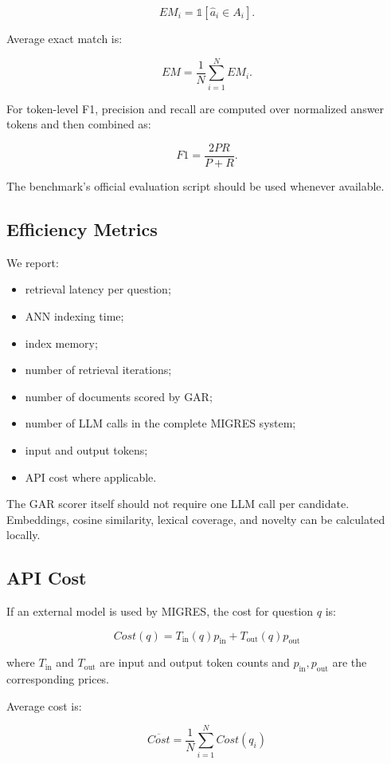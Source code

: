 \documentclass[11pt,a4paper]{article}
\begin{document}
\[
EM_i=
\mathbb{1}[\hat a_i\in A_i].
\]

Average exact match is:

\[
EM=
\frac{1}{N}
\sum_{i=1}^{N}EM_i.
\]

For token-level F1, precision and recall are computed over normalized answer tokens and then combined as:

\[
F1=\frac{2PR}{P+R}.
\]

The benchmark's official evaluation script should be used whenever available.

\subsection{Efficiency Metrics}

We report:

\begin{itemize}[leftmargin=1.5em]
\item retrieval latency per question;
\item ANN indexing time;
\item index memory;
\item number of retrieval iterations;
\item number of documents scored by GAR;
\item number of LLM calls in the complete MIGRES system;
\item input and output tokens;
\item API cost where applicable.
\end{itemize}

The GAR scorer itself should not require one LLM call per candidate. Embeddings, cosine similarity, lexical coverage, and novelty can be calculated locally.

\subsection{API Cost}

If an external model is used by MIGRES, the cost for question $q$ is:

\[
\boxed{
Cost(q)
=
T_{\mathrm{in}}(q)p_{\mathrm{in}}
+
T_{\mathrm{out}}(q)p_{\mathrm{out}}
}
\]

where $T_{\mathrm{in}}$ and $T_{\mathrm{out}}$ are input and output token counts and $p_{\mathrm{in}},p_{\mathrm{out}}$ are the corresponding prices.

Average cost is:

\[
\boxed{
\overline{Cost}
=
\frac{1}{N}
\sum_{i=1}^{N}Cost(q_i)
}
\]
\end{document}
